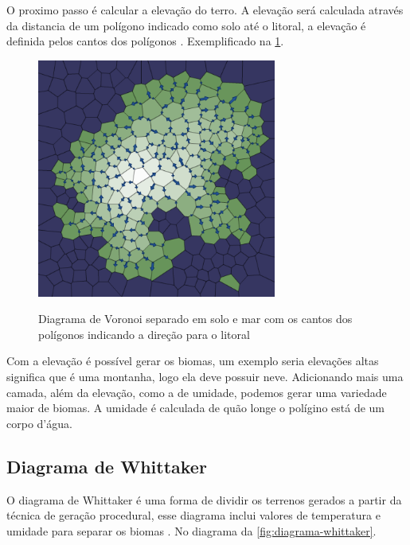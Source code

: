 O proximo passo é calcular a elevação do terro. A elevação será calculada através da distancia de um polígono indicado como solo até o litoral, a elevação é definida pelos cantos dos polígonos \cite{amitp2010}. Exemplificado na \cref{fig:downslopes}.

\begin{figure}[ht]
	\caption{Diagrama de Voronoi separado em solo e mar com os cantos dos polígonos indicando a direção para o litoral}
	\centering
	\includegraphics[width=0.7\textwidth]{figures/downslopes.png}
	\label{fig:downslopes}
\end{figure}

Com a elevação é possível gerar os biomas, um exemplo seria elevações altas significa que é uma montanha, logo ela deve possuir neve. Adicionando mais uma camada, além da elevação, como a de umidade, podemos gerar uma variedade maior de biomas. A umidade é calculada de quão longe o polígino está de um corpo d'água.

\subsection*{Diagrama de Whittaker}

O diagrama de Whittaker é uma forma de dividir os terrenos gerados a partir da técnica de geração procedural, esse diagrama inclui valores de temperatura e umidade para separar os biomas \cite{wikidotwhittakerdiagram}. No diagrama da \cref{fig:diagrama-whittaker}.

